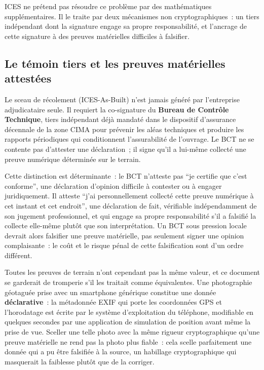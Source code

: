 \documentclass[11pt,a4paper]{article}
\begin{document}
ICES ne prétend pas résoudre ce problème par des mathématiques supplémentaires. Il le traite par deux mécanismes non cryptographiques~: un tiers indépendant dont la signature engage sa propre responsabilité, et l'ancrage de cette signature à des preuves matérielles difficiles à falsifier.

\subsection{Le témoin tiers et les preuves matérielles attestées}

Le sceau de récolement (ICES-As-Built) n'est jamais généré par l'entreprise adjudicataire seule. Il requiert la co-signature du \textbf{Bureau de Contrôle Technique}, tiers indépendant déjà mandaté dans le dispositif d'assurance décennale de la zone CIMA pour prévenir les aléas techniques et produire les rapports périodiques qui conditionnent l'assurabilité de l'ouvrage. Le BCT ne se contente pas d'attester une déclaration~; il signe qu'il a lui-même collecté une preuve numérique déterminée sur le terrain.

Cette distinction est déterminante~: le BCT n'atteste pas \enquote{je certifie que c'est conforme}, une déclaration d'opinion difficile à contester ou à engager juridiquement. Il atteste \enquote{j'ai personnellement collecté cette preuve numérique à cet instant et cet endroit}, une déclaration de fait, vérifiable indépendamment de son jugement professionnel, et qui engage sa propre responsabilité s'il a falsifié la collecte elle-même plutôt que son interprétation. Un BCT sous pression locale devrait alors falsifier une preuve matérielle, pas seulement signer une opinion complaisante~: le coût et le risque pénal de cette falsification sont d'un ordre différent.

Toutes les preuves de terrain n'ont cependant pas la même valeur, et ce document se garderait de tromperie s'il les traitait comme équivalentes. Une photographie géotaguée prise avec un smartphone générique constitue une donnée \textbf{déclarative}~: la métadonnée EXIF qui porte les coordonnées GPS et l'horodatage est écrite par le système d'exploitation du téléphone, modifiable en quelques secondes par une application de simulation de position avant même la prise de vue. Sceller une telle photo avec la même rigueur cryptographique qu'une preuve matérielle ne rend pas la photo plus fiable~: cela scelle parfaitement une donnée qui a pu être falsifiée à la source, un habillage cryptographique qui masquerait la faiblesse plutôt que de la corriger.
\end{document}
